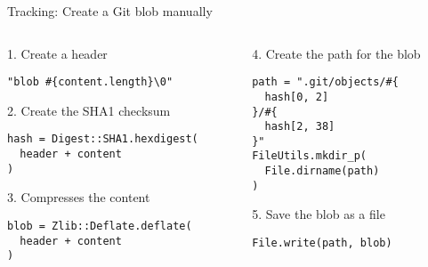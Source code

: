 \begin{frame}[fragile]{Tracking: Create a Git blob manually}
  \begin{columns}
    \begin{column}{0.5\textwidth}
      1. Create a header
      \begin{verbatim}
"blob #{content.length}\0"
      \end{verbatim}
      2. Create the SHA1 checksum
      \begin{verbatim}
hash = Digest::SHA1.hexdigest(
  header + content
)
      \end{verbatim}
      3. Compresses the content
      \begin{verbatim}
blob = Zlib::Deflate.deflate(
  header + content
)
      \end{verbatim}
    \end{column}
    \begin{column}{0.5\textwidth}
      4. Create the path for the blob
      \begin{verbatim}
path = ".git/objects/#{
  hash[0, 2]
}/#{
  hash[2, 38]
}"
FileUtils.mkdir_p(
  File.dirname(path)
)
      \end{verbatim}
      5. Save the blob as a file
      \begin{verbatim}
File.write(path, blob)
      \end{verbatim}
    \end{column}
  \end{columns}
\end{frame}
